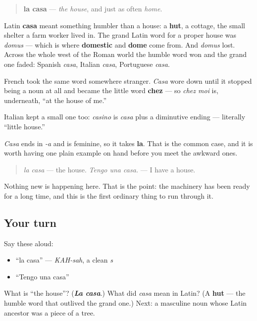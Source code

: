 \begin{cousinweb}
\begin{quote}
\textbf{la casa} — \emph{the house}, and just as often \emph{home}.
\end{quote}

Latin \textbf{casa} meant something humbler than a house: a \textbf{hut}, a cottage, the small shelter a farm worker lived in. The grand Latin word for a proper house was \emph{domus} — which is where \textbf{domestic} and \textbf{dome} come from. And \emph{domus} lost. Across the whole west of the Roman world the humble word won and the grand one faded: Spanish \emph{casa}, Italian \emph{casa}, Portuguese \emph{casa}.

French took the same word somewhere stranger. \emph{Casa} wore down until it stopped being a noun at all and became the little word \textbf{chez} — so \emph{chez moi} is, underneath, \textquotedblleft{}at the house of me.\textquotedblright{}

Italian kept a small one too: \emph{casino} is \emph{casa} plus a diminutive ending — literally \textquotedblleft{}little house.\textquotedblright{}
\end{cousinweb}

\begin{grammarlens}[title={Grammar Lens: a feminine noun, behaving exactly as promised}]
\emph{Casa} ends in \emph{-a} and is feminine, so it takes \textbf{la}. That is the common case, and it is worth having one plain example on hand before you meet the awkward ones.

\begin{quote}
\emph{la casa} — the house. \emph{Tengo una casa.} — I have a house.
\end{quote}

Nothing new is happening here. That is the point: the machinery has been ready for a long time, and this is the first ordinary thing to run through it.
\end{grammarlens}

\subsection*{Your turn}
Say these aloud:

\begin{itemize}
\raggedright
  \item \textquotedblleft{}la casa\textquotedblright{} — \emph{KAH-sah}, a clean \emph{s}
  \item \textquotedblleft{}Tengo una casa\textquotedblright{}
\end{itemize}

\begin{tcolorbox}[breakable,colback=teal!4,colframe=teal!35!black,title={Before you move on}]
What is \textquotedblleft{}the house\textquotedblright{}? (\emph{\textbf{La casa}}.) What did \emph{casa} mean in Latin? (A \textbf{hut} — the humble word that outlived the grand one.) Next: a masculine noun whose Latin ancestor was a piece of a tree.
\end{tcolorbox}

